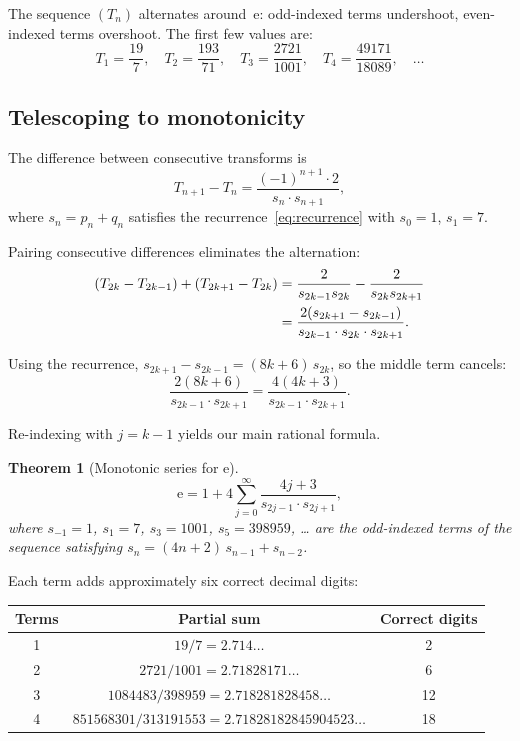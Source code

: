 \documentclass[11pt]{article}
\newtheorem{theorem}{Theorem}
\theoremstyle{definition}
\theoremstyle{remark}
\newcommand{\ee}{\mathrm{e}}
\begin{document}
The sequence $(T_n)$ alternates around~$\ee$: odd-indexed terms undershoot,
even-indexed terms overshoot. The first few values are:
\[
T_1 = \frac{19}{7}, \quad
T_2 = \frac{193}{71}, \quad
T_3 = \frac{2721}{1001}, \quad
T_4 = \frac{49171}{18089}, \quad \ldots
\]

\subsection{Telescoping to monotonicity}

The difference between consecutive transforms is
\begin{equation}\label{eq:diff}
T_{n+1} - T_n = \frac{(-1)^{n+1} \cdot 2}{s_n \cdot s_{n+1}},
\end{equation}
where $s_n = p_n + q_n$ satisfies the recurrence~\eqref{eq:recurrence} with
$s_0 = 1$, $s_1 = 7$.

Pairing consecutive differences eliminates the alternation:
\begin{align}
(T_{2k} - T_{2k-1}) + (T_{2k+1} - T_{2k})
&= \frac{2}{s_{2k-1} s_{2k}} - \frac{2}{s_{2k} s_{2k+1}} \notag\\
&= \frac{2(s_{2k+1} - s_{2k-1})}{s_{2k-1} \cdot s_{2k} \cdot s_{2k+1}}.
\label{eq:paired}
\end{align}

Using the recurrence, $s_{2k+1} - s_{2k-1} = (8k+6)\, s_{2k}$, so the middle
term cancels:
\begin{equation}\label{eq:simplified-term}
\frac{2(8k+6)}{s_{2k-1} \cdot s_{2k+1}} = \frac{4(4k+3)}{s_{2k-1} \cdot s_{2k+1}}.
\end{equation}

Re-indexing with $j = k - 1$ yields our main rational formula.

\begin{theorem}[Monotonic series for $\ee$]\label{thm:main}
\begin{equation}\label{eq:monotonic}
\ee = 1 + 4\sum_{j=0}^{\infty} \frac{4j+3}{s_{2j-1} \cdot s_{2j+1}},
\end{equation}
where $s_{-1} = 1$, $s_1 = 7$, $s_3 = 1001$, $s_5 = 398959$, \ldots{} are the
odd-indexed terms of the sequence satisfying
$s_n = (4n+2)\,s_{n-1} + s_{n-2}$.
\end{theorem}

Each term adds approximately six correct decimal digits:

\begin{center}
\begin{tabular}{ccc}
\toprule
Terms & Partial sum & Correct digits \\
\midrule
1 & $19/7 = 2.714\ldots$ & 2 \\
2 & $2721/1001 = 2.71828171\ldots$ & 6 \\
3 & $1084483/398959 = 2.718281828458\ldots$ & 12 \\
4 & $851568301/313191553 = 2.71828182845904523\ldots$ & 18 \\
\bottomrule
\end{tabular}
\end{center}
\end{document}
